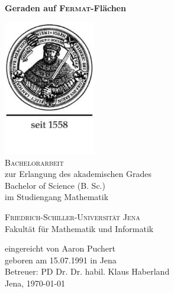 \begin{titlepage}
    \begin{center}
    
    \LARGE\textbf{
    Geraden auf \textsc{Fermat}-Flächen}\\
    \vspace{0.8cm}
    
    \includegraphics[width=4cm]{logo.pdf} \\
    
    \textsc{Bachelorarbeit} \\
    \vspace{0.8cm}
    \large
    zur Erlangung des akademischen Grades\\
    \vspace{0.3cm}
    Bachelor of Science (B. Sc.) \\
    \vspace{0.3cm}
    im Studiengang Mathematik \\
    \vspace{0.8cm}
    
    \textsc{Friedrich-Schiller-Universität Jena}\\
    \vspace{0.3cm}
    Fakultät für Mathematik und Informatik\\
    \vspace{0.8cm}
    
    eingereicht von Aaron Puchert \\
    \vspace{0.3cm}
    geboren am 15.07.1991 in Jena \\
    \vspace{0.3cm}
    Betreuer: PD Dr. Dr. habil. Klaus Haberland \\
    \vspace{0.6cm}
    Jena, \today
    
    
    \end{center}
\end{titlepage}